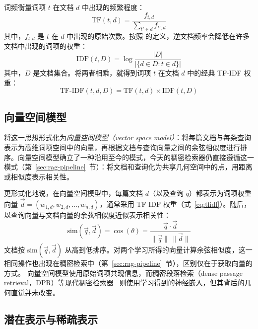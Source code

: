 词频衡量词项 $t$ 在文档 $d$ 中出现的频繁程度：
\begin{equation}
\mathrm{TF}(t,d) = \frac{f_{t,d}}{\sum_{t' \in d} f_{t',d}}
\label{eq:tf}
\end{equation}
其中，$f_{t,d}$ 是 $t$ 在 $d$ 中出现的原始次数。按照 \citet{sparckjones1972statistical} 的定义，逆文档频率会降低在许多文档中出现的词项的权重：
\begin{equation}
\mathrm{IDF}(t, D) = \log \frac{|D|}{|\{d \in D : t \in d\}|}
\label{eq:idf}
\end{equation}
其中，$D$ 是文档集合。将两者相乘，就得到词项 $t$ 在文档 $d$ 中的经典 TF-IDF 权重：
\begin{equation}
\mathrm{TF\text{-}IDF}(t,d,D) = \mathrm{TF}(t,d) \times \mathrm{IDF}(t,D)
\label{eq:tfidf}
\end{equation}

\subsection{向量空间模型}

\citet{salton1975vector} 将这一思想形式化为\emph{向量空间模型（vector space model）}：将每篇文档与每条查询表示为高维词项空间中的向量，再根据文档与查询向量之间的余弦相似度进行排序。向量空间模型确立了一种沿用至今的模式，今天的稠密检索器仍直接遵循这一模式（第~\ref{sec:rag-pipeline}~节）：将文档和查询化为共享几何空间中的点，用距离或相似度表示相关性。

更形式化地说，在向量空间模型中，每篇文档 $d$（以及查询 $q$）都表示为词项权重向量 $\vec{d} = (w_{1,d}, w_{2,d}, \dots, w_{n,d})$，通常采用 TF-IDF 权重（式~\ref{eq:tfidf}）。随后，以查询向量与文档向量的余弦相似度近似表示相关性：
\begin{equation}
\mathrm{sim}(\vec{q}, \vec{d}) = \cos(\theta) = \frac{\vec{q} \cdot \vec{d}}{\lVert \vec{q} \rVert \, \lVert \vec{d} \rVert}
\label{eq:cosinerag}
\end{equation}
文档按 $\mathrm{sim}(\vec{q}, \vec{d})$ 从高到低排序。对两个学习所得的向量计算余弦相似度，这一相同操作也出现在稠密检索中（第~\ref{sec:rag-pipeline}~节），区别仅在于获取向量的方式。
向量空间模型使用原始词项共现信息，而稠密段落检索（dense passage retrieval，DPR）等现代稠密检索器~\citep{karpukhin2020dense} 则使用学习得到的神经嵌入，但其背后的几何直觉并未改变。

\subsection{潜在表示与稀疏表示}

